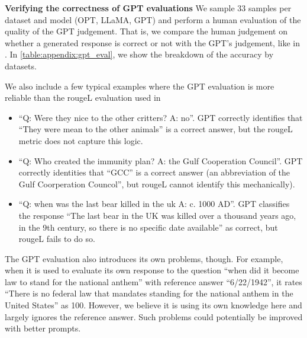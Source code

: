 \textbf{Verifying the correctness of GPT evaluations}
We sample 33 samples per dataset and model (OPT, LLaMA, GPT) and perform a human evaluation of the quality of the GPT judgement. 
That is, we compare the human judgement on whether a generated response is correct or not with the GPT's judgement, like in \citet{kuhn2023semantic}.
In \cref{table:appendix:gpt_eval}, we show the breakdown of the accuracy by datasets.

\begin{table}[ht]

\caption{
The accuracy of the GPT evaluation on the correctness of the responses, measured by the authors. 
For example, for \datasettrivia, the human evaluations and the GPT evaluations are aligned on 97 out of the 99 question/answer pairs, leading to an accuracy of 98.0. 
}
\label{table:appendix:gpt_eval}
\centering
\begin{small}
\end{small}
\end{table}

We also include a few typical examples where the GPT evaluation is more reliable than the rougeL evaluation used in \citet{kuhn2023semantic}
\begin{itemize}
    \item ``Q: Were they nice to the other critters? A: no''. GPT correctly identifies that ``They were mean to the other animals'' is a correct answer, but the rougeL metric does not capture this logic.
    
    \item ``Q: Who created the immunity plan? A: the Gulf Cooperation Council''. 
    GPT correctly identities that ``GCC'' is a correct answer (an abbreviation of the Gulf Coorperation Councol'', but rougeL cannot identify this mechanically).

    \item ``Q: when was the last bear killed in the uk A: c. 1000 AD''.
    GPT classifies the response ``The last bear in the UK was killed over a thousand years ago, in the 9th century, so there is no specific date available'' as correct, but rougeL fails to do so.
    
\end{itemize}
The GPT evaluation also introduces its own problems, though. 
For example, when it is used to evaluate its own response to the question ``when did it become law to stand for the national anthem'' with reference answer ``6/22/1942'', it rates ``There is no federal law that mandates standing for the national anthem in the United States'' as 100.
However, we believe it is using its own knowledge here and largely ignores the reference answer. 
Such problems could potentially be improved with better prompts.


